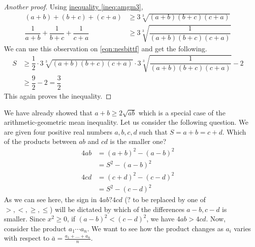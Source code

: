 \documentclass{subfile}
\begin{document}
		\begin{proof}[Another proof]
			Using \hyperref[ineq:amgm3]{inequality \ref{ineq:amgm3}},
				\begin{align*}
					(a+b)+(b+c)+(c+a)
						& \geq3\sqrt[3]{(a+b)(b+c)(c+a)}\\
					\dfrac{1}{a+b}+\dfrac{1}{b+c}+\dfrac{1}{c+a}
						& \geq3\sqrt[3]{\dfrac{1}{(a+b)(b+c)(c+a)}}
				\end{align*}
			We can use this observation on \hyperref[eqn:nesbittf]{\ref{eqn:nesbittf}} and get the following.
				\begin{align*}
					S
						& \geq\dfrac{1}{2}\cdot3\sqrt[3]{(a+b)(b+c)(c+a)}\cdot3\sqrt[3]{\dfrac{1}{(a+b)(b+c)(c+a)}}-2\\
						& \geq\dfrac{9}{2}-2=\dfrac{3}{2}
				\end{align*}
			This again proves the inequality.
		\end{proof}
	We have already showed that $a+b\geq2\sqrt{ab}$ which is a special case of the arithmetic-geometric mean inequality. Let us consider the following question. We are given four positive real numbers $a,b,c,d$ such that $S=a+b=c+d$. Which of the products between $ab$ and $cd$ is the smaller one?
		\begin{align*}
			4ab
				& = (a+b)^2-(a-b)^2\\
				& = S^2-(a-b)^2\\
			4cd
				& = (c+d)^2-(c-d)^2\\
				& = S^2-(c-d)^2
		\end{align*}
	As we can see here, the sign in $4ab?4cd$ ($?$ to be replaced by one of $>,<,\geq,\leq$) will be dictated by which of the differences $a-b,c-d$ is smaller. Since $x^2\geq0$, if $(a-b)^2<(c-d)^2$, we have $4ab>4cd$. Now, consider the product $a_1\cdots a_n$. We want to see how the product changes as $a_i$ varies with respect to $\bar{a}=\frac{a_1+\ldots+a_n}{n}$.
	
\end{document}
